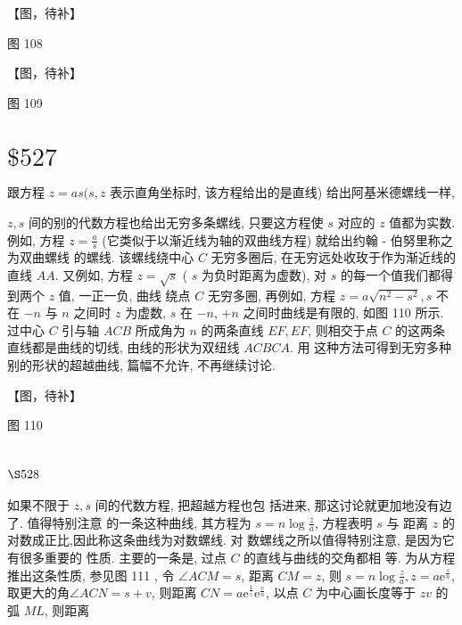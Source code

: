 【图，待补】

图 108


【图，待补】

图 109

\section{$\$ 527$}

跟方程 $z=a s(s, z$ 表示直角坐标时, 该方程给出的是直线) 给出阿基米德螺线一样,

$z, s$ 间的别的代数方程也给出无穷多条螺线, 只要这方程使 $s$ 对应的 $z$ 值都为实数. 例如, 方程 $z=\frac{a}{s}$ (它类似于以渐近线为轴的双曲线方程) 就给出约翰 - 伯努里称之为双曲螺线 的螺线. 该螺线绕中心 $C$ 无穷多圈后, 在无穷远处收玫于作为渐近线的直线 $A A$. 又例如, 方程 $z=\sqrt{s}$ ( $s$ 为负时距离为虚数), 对 $s$ 的每一个值我们都得到两个 $z$ 值, 一正一负, 曲线 绕点 $C$ 无穷多圈, 再例如, 方程 $z=a \sqrt{n^{2}-s^{2}}, s$ 不在 $-n$ 与 $n$ 之间时 $z$ 为虚数, $s$ 在 $-n$, $+n$ 之间时曲线是有限的, 如图 110 所示. 过中心 $C$ 引与轴 $A C B$ 所成角为 $n$ 的两条直线 $E F, E F$, 则相交于点 $C$ 的这两条直线都是曲线的切线, 由线的形状为双纽线 $A C B C A$. 用 这种方法可得到无穷多种别的形状的超越曲线, 篇幅不允许, 不再继续讨论.


【图，待补】

图 110

\section{$\S 528$}

如果不限于 $z, s$ 间的代数方程, 把超越方程也包 括进来, 那这讨论就更加地没有边了. 值得特别注意 的一条这种曲线, 其方程为 $s=n \log \frac{z}{a}$, 方程表明 $s$ 与 距离 $z$ 的对数成正比,因此称这条曲线为对数螺线. 对 数螺线之所以值得特别注意, 是因为它有很多重要的 性质. 主要的一条是, 过点 $C$ 的直线与曲线的交角都相 等. 为从方程推出这条性质, 参见图 111 , 令 $\angle A C M=s$, 距离 $C M=z$, 则 $s=n \log \frac{z}{a}, z=a \mathrm{e}^{\frac{s}{n}}$, 取更大的角$\angle A C N=s+v$, 则距离 $C N=a \mathrm{e}^{\frac{1}{i}} \mathrm{e}^{\frac{v}{n}}$, 以点 $C$ 为中心画长度等于 $z v$ 的弧 $M L$, 则距离


